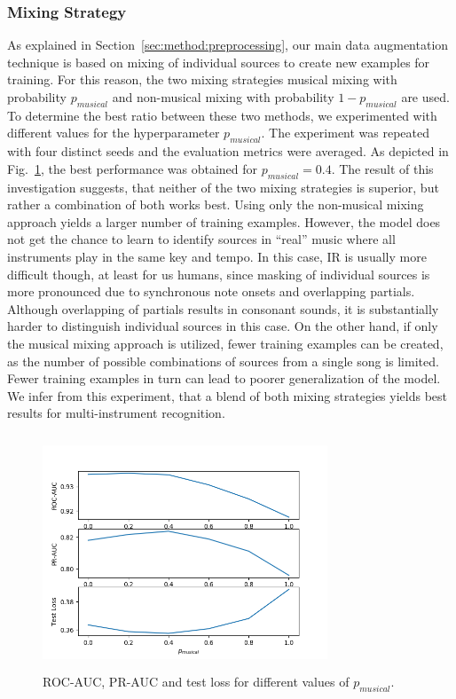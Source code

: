 \documentclass{article}
\begin{document}
\subsubsection{Mixing Strategy}
\label{sec:experiments:classifier:mixing}
As explained in Section~\ref{sec:method:preprocessing}, our main data augmentation technique is based on mixing of individual sources to create new examples for training. For this reason, the two mixing strategies musical mixing with probability $p_{musical}$ and non-musical mixing with probability $1 - p_{musical}$ are used. To determine the best ratio between these two methods, we experimented with different values for the hyperparameter $p_{musical}$. The experiment was repeated with four distinct seeds and the evaluation metrics were averaged. As depicted in Fig.~\ref{fig:mixing-strategy}, the best performance was obtained for $p_{musical}=0.4$. The result of this investigation suggests, that neither of the two mixing strategies is superior, but rather a combination of both works best. Using only the non-musical mixing approach yields a larger number of training examples. However, the model does not get the chance to learn to identify sources in \enquote{real} music where all instruments play in the same key and tempo. In this case, IR is usually more difficult though, at least for us humans, since masking of individual sources is more pronounced due to synchronous note onsets and overlapping partials. Although overlapping of partials results in consonant sounds, it is substantially harder to distinguish individual sources in this case. On the other hand, if only the musical mixing approach is utilized, fewer training examples can be created, as the number of possible combinations of sources from a single song is limited. Fewer training examples in turn can lead to poorer generalization of the model. We infer from this experiment, that a blend of both mixing strategies yields best results for multi-instrument recognition.
\begin{figure}[t]
	\begin{minipage}[b]{1.0\linewidth}
		\centering
		\centerline{\includegraphics[width=8.5cm,height=7.0cm]{p_mult_songs-experiment.png}}
	\end{minipage}
	\centering
	\caption{ROC-AUC, PR-AUC and test loss for different values of $p_{musical}$.}
	\label{fig:mixing-strategy}
	\vspace*{-0.05cm}	
\end{figure}
\end{document}
